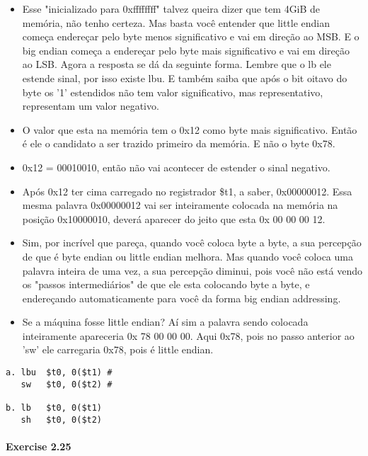 \documentclass{article}
\begin{document}
\begin{itemize}
\item Esse "inicializado para 0xffffffff" talvez queira dizer que tem 4GiB de 
memória, não tenho certeza. Mas basta você entender que little endian começa 
endereçar pelo byte menos significativo e vai em direção ao MSB. E o big endian 
começa a endereçar pelo byte mais significativo e vai em direção ao LSB. Agora 
a resposta se dá da seguinte forma. Lembre que o lb ele estende sinal, por isso 
existe lbu. E também saiba que após o bit oitavo do byte os '1' estendidos não 
tem valor significativo, mas representativo, representam um valor negativo.

\item O valor que esta na memória tem o 0x12 como byte mais significativo. 
Então é ele o candidato a ser trazido primeiro da memória. E não o byte 0x78.

\item 0x12 = 00010010, então não vai acontecer de estender o sinal negativo.

\item Após 0x12 ter cima carregado no registrador \$t1, a saber, 0x00000012. 
Essa mesma palavra 0x00000012 vai ser inteiramente colocada na memória na 
posição 0x10000010, deverá aparecer do jeito que esta 0x 00 00 00 12.

\item Sim, por incrível que pareça, quando você coloca byte a byte, a sua 
percepção de que é byte endian ou little endian melhora. Mas quando você coloca 
uma palavra inteira de uma vez, a sua percepção diminui, pois você não está 
vendo os "passos intermediários" de que ele esta colocando byte a byte, e 
endereçando automaticamente para você da forma big endian addressing.

\item Se a máquina fosse little endian? Aí sim a palavra sendo colocada 
inteiramente apareceria 0x 78 00 00 00. Aqui 0x78, pois no passo anterior ao 
'sw' ele carregaria 0x78, pois é little endian.
\end{itemize}



\begin{verbatim}
a. lbu  $t0, 0($t1) # 
   sw   $t0, 0($t2) #

b. lb   $t0, 0($t1)
   sh   $t0, 0($t2)
\end{verbatim}

\paragraph{Exercise 2.25}
\end{document}
